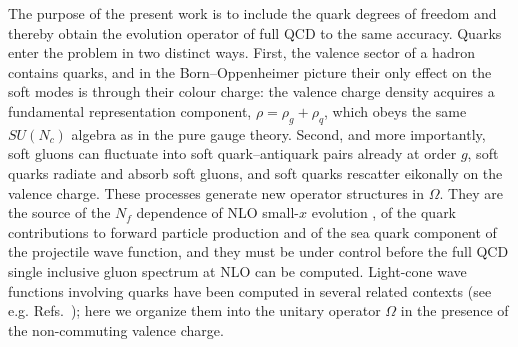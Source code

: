 \documentclass[11pt,a4paper]{article}
\numberwithin{equation}{section}
\newcommand{\OM}{\Omega}
\newcommand{\Nf}{N_{f}}
\begin{document}
The purpose of the present work is to include the quark degrees of freedom and thereby obtain
the evolution operator of full QCD to the same accuracy. Quarks enter the problem in two
distinct ways. First, the valence sector of a hadron contains quarks, and in the
Born--Oppenheimer picture \cite{Duan:2024nlr,Duan:2024qev,Duan:2024BOmodBFKL} their only effect on the
soft modes is through their colour charge: the valence charge density acquires a fundamental
representation component, $\rho=\rho_{g}+\rho_{q}$, which obeys the same $SU(N_{c})$ algebra as
in the pure gauge theory. Second, and more importantly, soft gluons can fluctuate into soft
quark--antiquark pairs already at order $g$, soft quarks radiate and absorb soft gluons, and
soft quarks rescatter eikonally on the valence charge. These processes generate new operator
structures in $\OM$. They are the source of the $\Nf$ dependence of NLO small-$x$ evolution
\cite{Balitsky:2006wa,Kovchegov:2006vj,Balitsky:2007feb,Kovner:2013ona,Lublinsky:2016meo}, of the
quark contributions to forward particle production and of the sea quark component of the
projectile wave function, and they must be under control before the full QCD single inclusive
gluon spectrum at NLO \cite{LRS:inprep} can be computed. Light-cone wave functions involving
quarks have been computed in several related contexts (see e.g.
Refs.~\cite{Beuf:2016wdz,Hanninen:2017ddy,Lappi:2016oup,Lappi:2026dglap}); here we organize them into
the unitary operator $\OM$ in the presence of the non-commuting valence charge.
\end{document}
